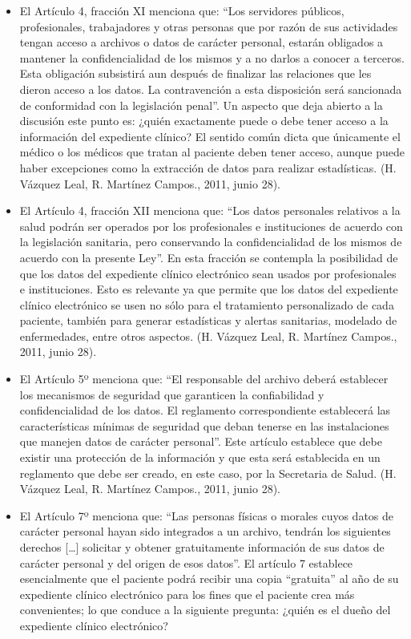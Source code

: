 \begin{itemize}
  \item El Artículo 4, fracción XI menciona que: “Los servidores públicos, profesionales, trabajadores y otras personas que por razón de sus actividades tengan acceso a archivos o datos de carácter personal, estarán obligados a mantener la confidencialidad de los mismos y a no darlos a conocer a terceros. Esta obligación subsistirá aun después de finalizar las relaciones que les dieron acceso a los datos. La contravención a esta disposición será sancionada de conformidad con la legislación penal”. Un aspecto que deja abierto a la discusión este punto es: ¿quién exactamente puede o debe tener acceso a la información del expediente clínico? El sentido común dicta que únicamente el médico o los médicos que tratan al paciente deben tener acceso, aunque puede haber excepciones como la extracción de datos para realizar estadísticas. (H. Vázquez Leal, R. Martínez Campos., 2011, junio 28).
  \item El Artículo 4, fracción XII menciona que: “Los datos personales relativos a la salud podrán ser operados por los profesionales e instituciones de acuerdo con la legislación sanitaria, pero conservando la confidencialidad de los mismos de acuerdo con la presente Ley”. En esta fracción se contempla la posibilidad de que los datos del expediente clínico electrónico sean usados por profesionales e instituciones. Esto es relevante ya que permite que los datos del expediente clínico electrónico se usen no sólo para el tratamiento personalizado de cada paciente, también para generar estadísticas y alertas sanitarias, modelado de enfermedades, entre otros aspectos. (H. Vázquez Leal, R. Martínez Campos., 2011, junio 28).
  \item El Artículo 5º menciona que: “El responsable del archivo deberá establecer los mecanismos de seguridad que garanticen la confiabilidad y confidencialidad de los datos. El reglamento correspondiente establecerá las características mínimas de seguridad que deban tenerse en las instalaciones que manejen datos de carácter personal”. Este artículo establece que debe existir una protección de la información y que esta será establecida en un reglamento que debe ser creado, en este caso, por la Secretaria de Salud. (H. Vázquez Leal, R. Martínez Campos., 2011, junio 28).
  \item El Artículo 7º menciona que: “Las personas físicas o morales cuyos datos de carácter personal hayan sido integrados a un archivo, tendrán los siguientes derechos […] solicitar y obtener gratuitamente información de sus datos de carácter personal y del origen de esos datos”. El artículo 7 establece esencialmente que el paciente podrá recibir una copia “gratuita” al año de su expediente clínico electrónico para los fines que el paciente crea más convenientes; lo que conduce a la siguiente pregunta: ¿quién es el dueño del expediente clínico electrónico?

\end{itemize}

